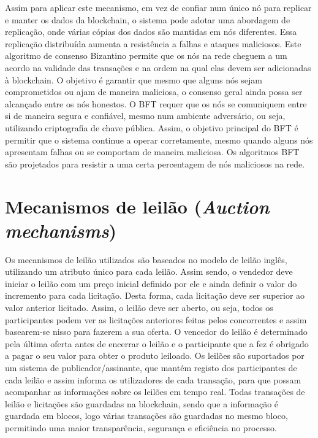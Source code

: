 \documentclass[conference]{IEEEtran}
\begin{document}
    Assim para aplicar este mecanismo, em vez de confiar num único nó para replicar e manter os dados da blockchain, o sistema pode adotar uma abordagem de replicação, onde várias cópias dos dados são mantidas em nós diferentes. Essa replicação distribuída aumenta a resistência a falhas e ataques maliciosos.
    Este algoritmo de consenso Bizantino permite que os nós na rede cheguem a um acordo na validade das transações e na ordem na qual elas devem ser adicionadas à blockchain. O objetivo é garantir que mesmo que alguns nós sejam comprometidos ou ajam de maneira maliciosa, o consenso geral ainda possa ser alcançado entre os nós honestos.
    O BFT requer que os nós se comuniquem entre si de maneira segura e confiável, mesmo num ambiente adversário, ou seja, utilizando criptografia de chave pública. Assim, o objetivo principal do BFT é permitir que o sistema continue a operar corretamente, mesmo quando alguns nós apresentam falhas ou se comportam de maneira maliciosa. Os algoritmos BFT são projetados para resistir a uma certa percentagem de nós maliciosos na rede.\\


    \section{Mecanismos de leilão (\textit{Auction mechanisms})}

    Os mecanismos de leilão utilizados são baseados no modelo de leilão inglês, utilizando um atributo único para cada leilão.
    Assim sendo, o vendedor deve iniciar o leilão com um preço inicial definido por ele e ainda definir o valor do incremento para cada licitação. Desta forma, cada licitação deve ser superior ao valor anterior licitado. Assim, o leilão deve ser aberto, ou seja, todos os participantes podem ver as licitações anteriores feitas pelos concorrentes e assim basearem-se nisso para fazerem a sua oferta. O vencedor do leilão é determinado pela última oferta antes de encerrar o leilão e o participante que a fez é obrigado a pagar o seu valor para obter o produto leiloado.
    Os leilões são suportados por um sistema de publicador/assinante, que mantém registo dos participantes de cada leilão e assim informa os utilizadores de cada transação, para que possam acompanhar as informações sobre os leilões em tempo real. Todas transações de leilão e licitações são guardadas na blockchain, sendo que a informação é guardada em blocos, logo várias transações são guardadas no mesmo bloco, permitindo uma maior transparência, segurança e eficiência no processo.
\end{document}
